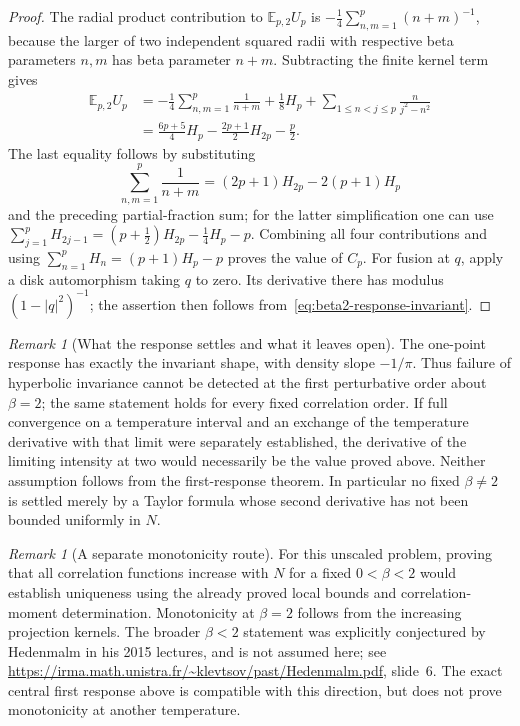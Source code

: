\documentclass[11pt,a4paper]{article}
\numberwithin{equation}{section}
\theoremstyle{definition}
\theoremstyle{remark}
\newtheorem{remark}[theorem]{Remark}
\newcommand{\E}{\mathbb E}
\begin{document}
\begin{proof}
The radial product contribution to $\E_{p,2}U_p$ is
$-\tfrac14\sum_{n,m=1}^p(n+m)^{-1}$, because the larger of two
independent squared radii with respective beta parameters $n,m$
has beta parameter $n+m$.  Subtracting the finite kernel term gives
\begin{align*}
 \E_{p,2}U_p
 &=-\frac14\sum_{n,m=1}^p\frac1{n+m}
   +\frac18H_p+\sum_{1\le n<j\le p}\frac{n}{j^2-n^2}\\
 &=\frac{6p+5}{4}H_p-\frac{2p+1}{2}H_{2p}-\frac p2.
\end{align*}
The last equality follows by substituting
\[
 \sum_{n,m=1}^p\frac1{n+m}
 =(2p+1)H_{2p}-2(p+1)H_p
\]
and the preceding partial-fraction sum; for the latter simplification
one can use
$\sum_{j=1}^pH_{2j-1}=(p+\tfrac12)H_{2p}-\tfrac14H_p-p$.
Combining all four contributions and using
$\sum_{n=1}^pH_n=(p+1)H_p-p$ proves the value of $C_p$.
For fusion at $q$, apply a disk automorphism taking $q$ to zero.
Its derivative there has modulus $(1-|q|^2)^{-1}$; the assertion
then follows from~\eqref{eq:beta2-response-invariant}.
\end{proof}

\begin{remark}[What the response settles and what it leaves open]
The one-point response has exactly the invariant shape, with density
slope $-1/\pi$.  Thus failure of hyperbolic invariance cannot be
detected at the first perturbative order about $\beta=2$; the same
statement holds for every fixed correlation order.  If full
convergence on a temperature interval and an exchange of the
temperature derivative with that limit were separately established,
the derivative of the limiting intensity at two would necessarily
be the value proved above.  Neither assumption follows from the
first-response theorem.  In particular no fixed $\beta\ne2$ is
settled merely by a Taylor formula whose second derivative has not
been bounded uniformly in $N$.
\end{remark}

\begin{remark}[A separate monotonicity route]
For this unscaled problem, proving that all correlation functions
increase with $N$ for a fixed $0<\beta<2$ would establish uniqueness
using the already proved local bounds and correlation-moment
determination.  Monotonicity at $\beta=2$ follows from the increasing
projection kernels.  The broader $\beta<2$ statement was explicitly
conjectured by Hedenmalm in his 2015 lectures, and is not assumed here;
see \url{https://irma.math.unistra.fr/~klevtsov/past/Hedenmalm.pdf},
slide~6.  The exact central first response above is compatible with
this direction, but does not prove monotonicity at another temperature.
\end{remark}
\end{document}
